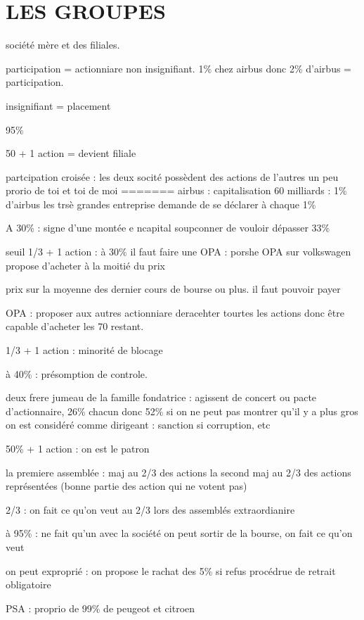 \documentclass[a4paper,12pt]{article}
\begin{document}
\section{LES GROUPES}

société mère et des filiales.

participation = actionniare non insignifiant.  1\% chez airbus
donc 2\% d'airbus = participation. 

insignifiant = placement

95\%

50 + 1 action = devient filiale

partcipation croisée : les  deux socité possèdent des actions de l'autres
un peu prorio de toi et toi de moi
=======
airbus : capitalisation 60 milliards : 1\% d'airbus
les trsè grandes entreprise demande de se déclarer à chaque 1\% 


A 30\% : signe d'une montée e ncapital
soupconner de vouloir dépasser 33\%

seuil 1/3 + 1 action : 
à 30\% il faut faire une OPA  :  porshe OPA sur volkswagen propose d'acheter à la moitié du prix

prix sur la moyenne des dernier cours de bourse ou plus. il faut pouvoir payer
 
OPA : proposer aux autres actionniare deracehter tourtes les actions donc être
capable d'acheter les 70 restant.

1/3 + 1 action : minorité de blocage

à 40\% : présomption de controle.

deux frere jumeau de la famille fondatrice : agissent de concert ou pacte d'actionnaire, 26\% chacun donc 52\%
si on ne peut pas montrer qu'il y a plus gros on est considéré comme dirigeant : sanction si corruption, etc

50\% + 1 action : on est le patron

la premiere assemblée :  maj au 2/3 des actions
la second maj au 2/3 des actions représentées (bonne partie des action qui ne votent pas)


2/3 : on fait ce qu'on veut au 2/3 lors des assemblés extraordianire

à 95\% : ne fait qu'un avec la société
on peut sortir de la bourse, on fait ce qu'on veut

on peut exproprié : on propose le rachat des 5\% si refus
procédrue de retrait obligatoire

PSA : proprio de 99\% de peugeot et citroen
\end{document}
